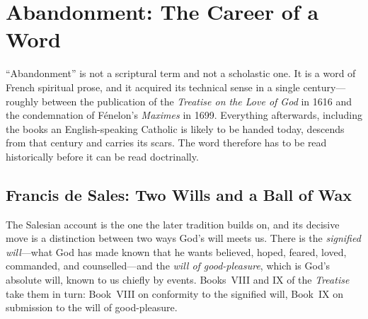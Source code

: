 \section{Abandonment: The Career of a Word}

``Abandonment'' is not a scriptural term and not a scholastic one. It is a word of French spiritual prose, and it acquired its technical sense in a single century---roughly between the publication of the \emph{Treatise on the Love of God} in 1616 and the condemnation of Fénelon's \emph{Maximes} in 1699. Everything afterwards, including the books an English-speaking Catholic is likely to be handed today, descends from that century and carries its scars. The word therefore has to be read historically before it can be read doctrinally.

\subsection{Francis de Sales: Two Wills and a Ball of Wax}

The Salesian account is the one the later tradition builds on, and its decisive move is a distinction between two ways God's will meets us. There is the \emph{signified will}---what God has made known that he wants believed, hoped, feared, loved, commanded, and counselled---and the \emph{will of good-pleasure}, which is God's absolute will, known to us chiefly by events. Books~VIII and IX of the \emph{Treatise} take them in turn: Book~VIII on conformity to the signified will, Book~IX on submission to the will of good-pleasure.

